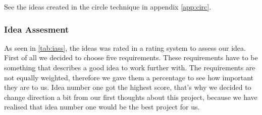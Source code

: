 See the ideas created in the circle technique in appendix \ref{app:circ}.

\subsubsection{Idea Assesment}
As seen in \autoref{tab:iass}, the ideas was rated in a rating system to assess our idea. First of all we decided to choose five requirements. These requirements have to be something that describes a good idea to work further with. The requirements are not equally weighted, therefore we gave them a percentage to see how important they are to us. Idea number one got the highest score, that's why we decided to change direction a bit from our first thoughts about this project, because we have realised that idea number one would be the best project for us. 


